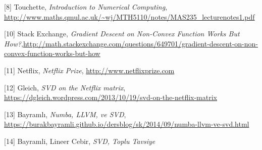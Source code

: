 \documentclass[12pt,fleqn]{article}\usepackage{../../common}
\begin{document}
[8] Touchette, {\em Introduction to Numerical Computing}, \url{http://www.maths.qmul.ac.uk/~wj/MTH5110/notes/MAS235_lecturenotes1.pdf}

[10] Stack Exchange, {\em Gradient Descent on Non-Convex Function Works But How?},\url{http://math.stackexchange.com/questions/649701/gradient-descent-on-non-convex-function-works-but-how}

[11] Netflix, {\em Netflix Prize}, \url{http://www.netflixprize.com}

[12] Gleich, {\em SVD on the Netflix matrix}, \url{https://dgleich.wordpress.com/2013/10/19/svd-on-the-netflix-matrix}

[13] Bayramlı, 
     {\em Numba, LLVM, ve SVD}, 
     \url{https://burakbayramli.github.io/dersblog/sk/2014/09/numba-llvm-ve-svd.html}

[14] Bayramli, Lineer Cebir, {\em SVD, Toplu Tavsiye}
\end{document}
